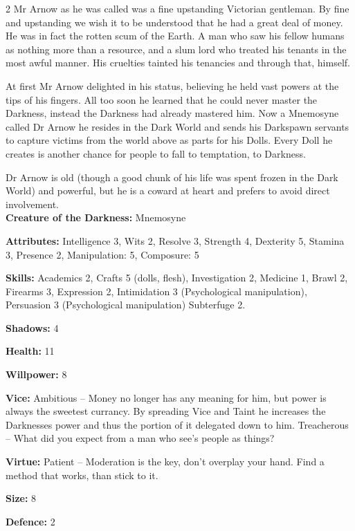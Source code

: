 \begin{multicols}{2}
Mr Arnow as he was called was a fine upstanding Victorian gentleman. By fine and upstanding we wish it to be understood that he had a great deal of money. He was in fact the rotten scum of the Earth. A man who saw his fellow humans as nothing more than a resource, and a slum lord who treated his tenants in the most awful manner. His cruelties tainted his tenancies and through that, himself.

At first Mr Arnow delighted in his status, believing he held vast powers at the tips of his fingers. All too soon he learned that he could never master the Darkness, instead the Darkness had already mastered him. Now a Mnemosyne called Dr Arnow he resides in the Dark World and sends his Darkspawn servants to capture victims from the world above as parts for his Dolls. Every Doll he creates is another chance for people to fall to temptation, to Darkness.

Dr Arnow is old (though a good chunk of his life was spent frozen in the Dark World) and powerful, but he is a coward at heart and prefers to avoid direct involvement.\\

\noindent \textbf{Creature of the Darkness:} Mnemosyne

\noindent \textbf{Attributes:} Intelligence 3, Wits 2, Resolve 3, Strength 4, Dexterity 5, Stamina 3, Presence 2, Manipulation: 5, Composure: 5

\noindent \textbf{Skills:} Academics 2, Crafts 5 (dolls, flesh), Investigation 2, Medicine 1, Brawl 2, Firearms 3, Expression 2, Intimidation 3 (Psychological manipulation), Persuasion 3 (Psychological manipulation) Subterfuge 2.

\noindent \textbf{Shadows:} 4

\noindent \textbf{Health:} 11

\noindent \textbf{Willpower:} 8

\noindent \textbf{Vice:} Ambitious – Money no longer has any meaning for him, but power is always the sweetest currancy. By spreading Vice and Taint he increases the Darknesses power and thus the portion of it delegated down to him. Treacherous – What did you expect from a man who see's people as things?

\noindent \textbf{Virtue:} Patient – Moderation is the key, don't overplay your hand. Find a method that works, than stick to it.

\noindent \textbf{Size:} 8

\noindent \textbf{Defence:} 2


\end{multicols}
